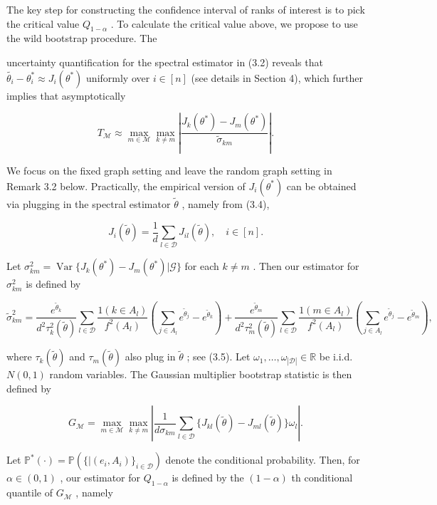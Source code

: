 The key step for constructing the confidence interval of ranks of
interest is to pick the critical value \(Q_{1 - \alpha}\) . To calculate
the critical value above, we propose to use the wild bootstrap
procedure. The

uncertainty quantification for the spectral estimator in (3.2) reveals
that
\(\widetilde{\theta_{i}} - \theta_{i}^{*} \approx J_{i}(\theta^{*})\)
uniformly over \(i \in [n]\) (see details in Section 4), which further
implies that asymptotically

\[
T_{\mathcal{M}} \approx \max_{m \in \mathcal{M}} \max_{k \neq m} \left| \frac{J_{k}(\theta^{*}) - J_{m}(\theta^{*})}{\widetilde{\sigma}_{km}} \right|. \tag{3.12}
\]

We focus on the fixed graph setting and leave the random graph setting
in Remark 3.2 below. Practically, the empirical version of
\(J_{i}(\theta^{*})\) can be obtained via plugging in the spectral
estimator \(\widetilde{\theta}\) , namely from (3.4),

\[
J_{i}(\widetilde{\theta}) = \frac{1}{d} \sum_{l \in \mathcal{D}} J_{il}(\widetilde{\theta}), \quad i \in [n].
\]

Let
\(\sigma_{km}^{2} = \operatorname {Var}\{J_{k}(\theta^{*}) - J_{m}(\theta^{*}) | \mathcal{G} \}\)
for each \(k \neq m\) . Then our estimator for \(\sigma_{km}^{2}\) is
defined by

\[
\widetilde{\sigma}_{km}^{2} = \frac{e^{\widetilde{\theta}_{k}}}{d^{2} \tau_{k}^{2}(\widetilde{\theta})} \sum_{l \in \mathcal{D}} \frac{1(k \in A_{l})}{f^{2}(A_{l})} \left(\sum_{j \in A_{l}} e^{\widetilde{\theta}_{j}} - e^{\widetilde{\theta}_{k}}\right) + \frac{e^{\widetilde{\theta}_{m}}}{d^{2} \tau_{m}^{2}(\widetilde{\theta})} \sum_{l \in \mathcal{D}} \frac{1(m \in A_{l})}{f^{2}(A_{l})} \left(\sum_{j \in A_{l}} e^{\widetilde{\theta}_{j}} - e^{\widetilde{\theta}_{m}}\right), \tag{3.13}
\]

where \(\tau_{k}(\widetilde{\theta})\) and
\(\tau_{m}(\widetilde{\theta})\) also plug in \(\widetilde{\theta}\) ;
see (3.5). Let
\(\omega_{1}, \ldots , \omega_{|\mathcal{D}|} \in \mathbb{R}\) be i.i.d.
\(N(0,1)\) random variables. The Gaussian multiplier bootstrap statistic
is then defined by

\[
G_{\mathcal{M}} = \max_{m \in \mathcal{M}} \max_{k \neq m} \left| \frac{1}{d \sigma_{km}} \sum_{l \in \mathcal{D}} \{J_{kl}(\widetilde{\theta}) - J_{ml}(\widetilde{\theta})\} \omega_{l} \right|. \tag{3.14}
\]

Let
\(\mathbb{P}^{*}(\cdot) = \mathbb{P}(\{|(e_{i}, A_{i})\}_{i \in \mathcal{D}})\)
denote the conditional probability. Then, for \(\alpha \in (0,1)\) , our
estimator for \(Q_{1 - \alpha}\) is defined by the \((1 - \alpha)\) th
conditional quantile of \(G_{\mathcal{M}}\) , namely

